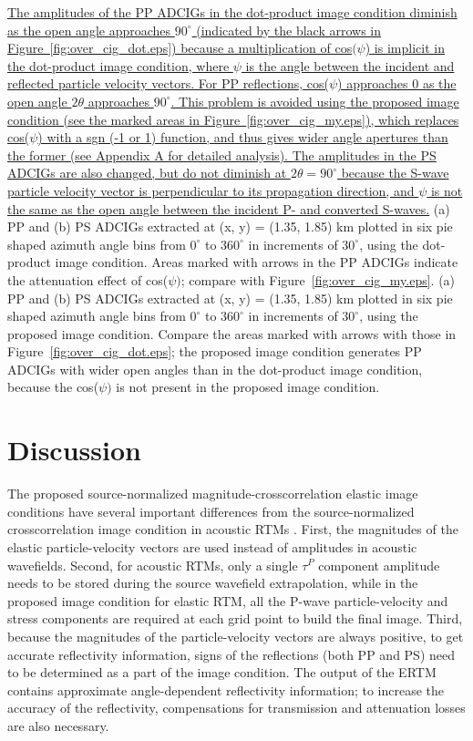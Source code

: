 \documentclass[manuscript,ulem,graphix,revised]{geophysics}
\begin{document}
\uline{The amplitudes \marginpar{[4]} of the PP ADCIGs in the dot-product image condition diminish as the open angle approaches $90^\circ$ (indicated by the black arrows in Figure~\ref{fig:over_cig_dot.eps}) because a multiplication of cos$(\psi$) is implicit in the dot-product image condition, where $\psi$ is the angle between the incident and reflected particle velocity vectors. For PP reflections, cos($\psi$) approaches 0 as the open angle $2\theta$ approaches $\mathrm{90^\circ}$. This problem is avoided using the proposed image condition (see the marked areas in Figure~\ref{fig:over_cig_my.eps}), which replaces cos($\psi$) with a sgn (-1 or 1) function, and thus gives wider angle apertures than the former (see Appendix A for detailed analysis). The amplitudes in the PS ADCIGs are also changed, but do not diminish at $2\theta=90^\circ$ because the S-wave particle velocity vector is perpendicular to its propagation direction, and $\psi$ is not the same as the open angle between the incident P- and converted S-waves.}
{
(a) PP and (b) PS ADCIGs extracted at (x, y) = (1.35, 1.85) km plotted in six pie shaped azimuth angle bins from $\mathrm{0^\circ}$ to $\mathrm{360^\circ}$ in increments of $\mathrm{30^\circ}$, using the dot-product image condition. Areas marked with arrows in the PP ADCIGs indicate the attenuation effect of cos($\psi)$; compare with Figure~\ref{fig:over_cig_my.eps}.
}
{
(a) PP and (b) PS ADCIGs extracted at (x, y) = (1.35, 1.85) km plotted in six pie shaped azimuth angle bins from $\mathrm{0^\circ}$ to $\mathrm{360^\circ}$ in increments of $\mathrm{30^\circ}$, using the proposed image condition. Compare the areas marked with arrows with those in Figure~\ref{fig:over_cig_dot.eps}; the proposed image condition generates PP ADCIGs with wider open angles than in the dot-product image condition, because the cos($\psi)$ is not present in the proposed image condition.
}

\section{Discussion}

The proposed source-normalized magnitude-crosscorrelation elastic image conditions have several important differences from the source-normalized crosscorrelation image condition in acoustic RTMs \citep{kaelin06}. First, the magnitudes of the elastic particle-velocity vectors are used instead of amplitudes in acoustic wavefields. Second, for acoustic RTMs, only a single $\tau^P$ component amplitude needs to be stored during the source wavefield extrapolation, while in the proposed image condition for elastic RTM, all the P-wave particle-velocity and stress components are required at each grid point to build the final image. Third, because the magnitudes of the particle-velocity vectors are always positive, to get accurate reflectivity information, signs of the reflections (both PP and PS) need to be determined as a part of the image condition. The output of the ERTM contains approximate angle-dependent reflectivity information; to increase the accuracy of the reflectivity, compensations for transmission and attenuation losses \citep{deng07,deng08} are also necessary.
\end{document}
